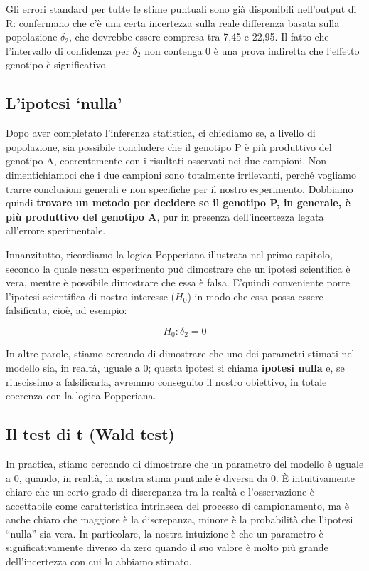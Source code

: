 \documentclass[
  12pt,
]{book}
\begin{document}
Gli errori standard per tutte le stime puntuali sono già disponibili nell'output di R: confermano che c'è una certa incertezza sulla reale differenza basata sulla popolazione \(\delta_2\), che dovrebbe essere compresa tra 7,45 e 22,95. Il fatto che l'intervallo di confidenza per \(\delta_2\) non contenga 0 è una prova indiretta che l'effetto genotipo è significativo.

\hypertarget{lipotesi-nulla}{%
\subsection{L'ipotesi `nulla'}\label{lipotesi-nulla}}

Dopo aver completato l'inferenza statistica, ci chiediamo se, a livello di popolazione, sia possibile concludere che il genotipo P è più produttivo del genotipo A, coerentemente con i risultati osservati nei due campioni. Non dimentichiamoci che i due campioni sono totalmente irrilevanti, perché vogliamo trarre conclusioni generali e non specifiche per il nostro esperimento. Dobbiamo quindi \textbf{trovare un metodo per decidere se il genotipo P, in generale, è più produttivo del genotipo A}, pur in presenza dell'incertezza legata all'errore sperimentale.

Innanzitutto, ricordiamo la logica Popperiana illustrata nel primo capitolo, secondo la quale nessun esperimento può dimostrare che un'ipotesi scientifica è vera, mentre è possibile dimostrare che essa è falsa. E'quindi conveniente porre l'ipotesi scientifica di nostro interesse (\(H_0\)) in modo che essa possa essere falsificata, cioè, ad esempio:

\[H_0: \delta_2 = 0\]

In altre parole, stiamo cercando di dimostrare che uno dei parametri stimati nel modello sia, in realtà, uguale a 0; questa ipotesi si chiama \textbf{ipotesi nulla} e, se riuscissimo a falsificarla, avremmo conseguito il nostro obiettivo, in totale coerenza con la logica Popperiana.

\hypertarget{il-test-di-t-wald-test}{%
\subsection{Il test di t (Wald test)}\label{il-test-di-t-wald-test}}

In practica, stiamo cercando di dimostrare che un parametro del modello è uguale a 0, quando, in realtà, la nostra stima puntuale è diversa da 0. È intuitivamente chiaro che un certo grado di discrepanza tra la realtà e l'osservazione è accettabile come caratteristica intrinseca del processo di campionamento, ma è anche chiaro che maggiore è la discrepanza, minore è la probabilità che l'ipotesi ``nulla'' sia vera. In particolare, la nostra intuizione è che un parametro è significativamente diverso da zero quando il suo valore è molto più grande dell'incertezza con cui lo abbiamo stimato.
\end{document}

